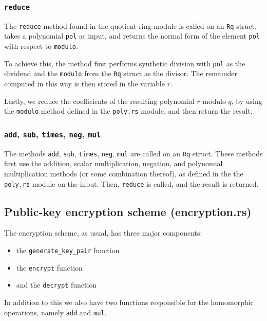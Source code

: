 \documentclass[../main.tex]{subfiles}
\begin{document}
\subsubsection{\lstinline{reduce}}

The \lstinline{reduce} method found in the quotient ring module is called on an \lstinline{Rq} struct, takes a polynomial \lstinline{pol} as input, and returns the normal form of the element \lstinline{pol} with respect to \lstinline{modulo}.

To achieve this, the method first performs synthetic division with \lstinline{pol} as the dividend and the \lstinline{modulo} from the \lstinline{Rq} struct as the divisor. The remainder computed in this way is then stored in the variable $r$.

Lastly, we reduce the coefficients of the resulting polynomial $r$ modulo $q$, by using the \lstinline{modulo} method defined in the \lstinline{poly.rs} module, and then return the result.

\subsubsection{\lstinline{add}, \lstinline{sub}, \lstinline{times}, \lstinline{neg}, \lstinline{mul}}

The methods \lstinline{add}, \lstinline{sub}, \lstinline{times}, \lstinline{neg}, \lstinline{mul} are called on an \lstinline{Rq} struct.
These methods first use the addition, scalar multiplication, negation, and polynomial multiplication methods (or some combination thereof), as defined in the the \lstinline{poly.rs} module on the input.
Then, \lstinline{reduce} is called, and the result is returned.

\subsection{Public-key encryption scheme (encryption.rs)}

The encryption scheme, as usual, has three major components:

\begin{itemize}
  \item the \lstinline{generate_key_pair} function
  \item the \lstinline{encrypt} function
  \item and the \lstinline{decrypt} function
\end{itemize}

In addition to this we also have two functions responsible for the homomorphic operations, namely \lstinline{add} and \lstinline{mul}.
\end{document}
